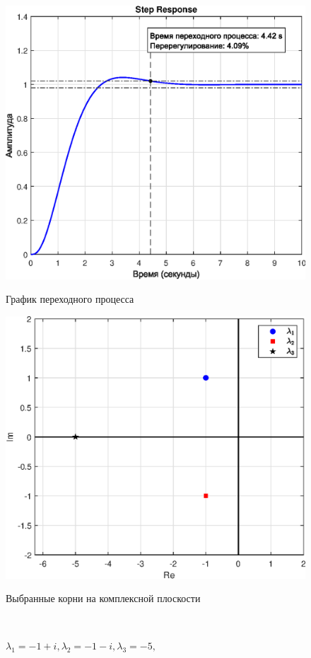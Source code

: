 \documentclass[a4paper]{article}
\begin{document}
\begin{figure}[H]
    \begin{minipage}{0.5\textwidth}
        \centering \includegraphics[width=\textwidth]{ex2/-1+1i_-1-1i_-5.eps}
        \caption{$\lambda_1=-1+i, \lambda_2=-1-i, \lambda_3=-5,$}
        \centerline{График переходного процесса}
    \end{minipage}\hfill
    \begin{minipage}{0.5\textwidth}
        \centering \includegraphics[width=\textwidth]{ex2/complex_plan_-1+1i_-1-1i_-5.eps}
        \caption{$\lambda_1=-1+i, \lambda_2=-1-i, \lambda_3=-5,$}
        \centerline{Выбранные корни на комплексной плоскости}
    \end{minipage}\\[1em]
\end{figure}\noindent\
\end{document}
